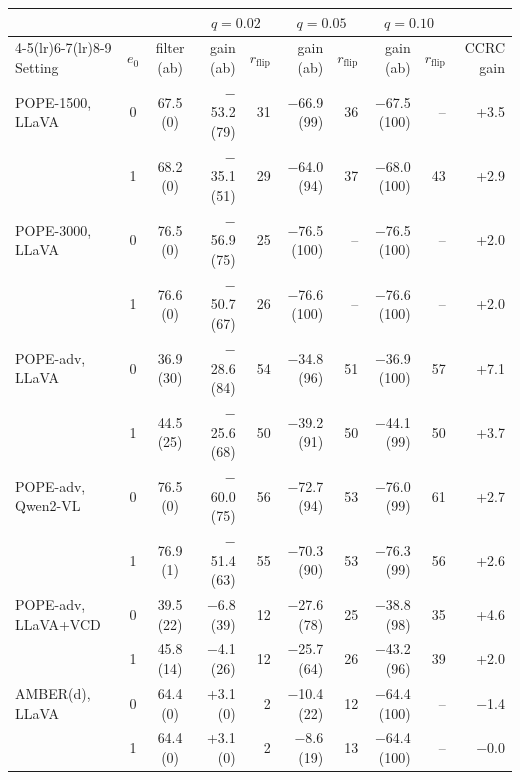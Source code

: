 \begin{tabular}{lccrrrrrrr}
\toprule
 & & & \multicolumn{2}{c}{$q{=}0.02$} & \multicolumn{2}{c}{$q{=}0.05$} & \multicolumn{2}{c}{$q{=}0.10$} & \\
\cmidrule(lr){4-5}\cmidrule(lr){6-7}\cmidrule(lr){8-9}
Setting & $e_0$ & filter (ab) & gain (ab) & $r_{\text{flip}}$ & gain (ab) & $r_{\text{flip}}$ & gain (ab) & $r_{\text{flip}}$ & CCRC gain\\
\midrule
POPE-1500, LLaVA & 0 & 67.5 (0) & $-$53.2 (79) & 31 & $-$66.9 (99) & 36 & $-$67.5 (100) & -- & +3.5\\
 & 1 & 68.2 (0) & $-$35.1 (51) & 29 & $-$64.0 (94) & 37 & $-$68.0 (100) & 43 & +2.9\\
\addlinespace
POPE-3000, LLaVA & 0 & 76.5 (0) & $-$56.9 (75) & 25 & $-$76.5 (100) & -- & $-$76.5 (100) & -- & +2.0\\
 & 1 & 76.6 (0) & $-$50.7 (67) & 26 & $-$76.6 (100) & -- & $-$76.6 (100) & -- & +2.0\\
\addlinespace
POPE-adv, LLaVA & 0 & 36.9 (30) & $-$28.6 (84) & 54 & $-$34.8 (96) & 51 & $-$36.9 (100) & 57 & +7.1\\
 & 1 & 44.5 (25) & $-$25.6 (68) & 50 & $-$39.2 (91) & 50 & $-$44.1 (99) & 50 & +3.7\\
\addlinespace
POPE-adv, Qwen2-VL & 0 & 76.5 (0) & $-$60.0 (75) & 56 & $-$72.7 (94) & 53 & $-$76.0 (99) & 61 & +2.7\\
 & 1 & 76.9 (1) & $-$51.4 (63) & 55 & $-$70.3 (90) & 53 & $-$76.3 (99) & 56 & +2.6\\
\addlinespace
POPE-adv, LLaVA+VCD & 0 & 39.5 (22) & $-$6.8 (39) & 12 & $-$27.6 (78) & 25 & $-$38.8 (98) & 35 & +4.6\\
 & 1 & 45.8 (14) & $-$4.1 (26) & 12 & $-$25.7 (64) & 26 & $-$43.2 (96) & 39 & +2.0\\
\addlinespace
AMBER(d), LLaVA & 0 & 64.4 (0) & +3.1 (0) & 2 & $-$10.4 (22) & 12 & $-$64.4 (100) & -- & $-$1.4\\
 & 1 & 64.4 (0) & +3.1 (0) & 2 & $-$8.6 (19) & 13 & $-$64.4 (100) & -- & $-$0.0\\
\bottomrule
\end{tabular}
